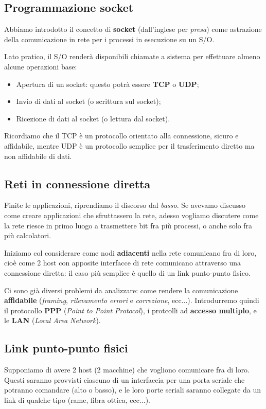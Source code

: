 \documentclass[a4paper,11pt]{article}
\begin{document}
\subsection{Programmazione socket}
Abbiamo introdotto il concetto di \textbf{socket} (dall'inglese per \textit{presa}) come astrazione della comunicazione in rete per i processi in esecuzione su un S/O.

Lato pratico, il S/O renderà disponibili chiamate a sistema per effettuare almeno alcune operazioni base:
\begin{itemize}
	\item Apertura di un socket: questo potrà essere \textbf{TCP} o \textbf{UDP};
	\item Invio di dati al socket (o scrittura sul socket);
	\item Ricezione di dati al socket (o lettura dal socket).
\end{itemize}

Ricordiamo che il TCP è un protocollo orientato alla connessione, sicuro e affidabile, mentre UDP è un protocollo semplice per il trasferimento diretto ma non affidabile di dati.

\subsection{Reti in connessione diretta}
Finite le applicazioni, riprendiamo il discorso dal \textit{basso}. Se avevamo discusso come creare applicazioni che sfruttassero la rete, adesso vogliamo discutere come la rete riesce in primo luogo a trasmettere bit fra più processi, o anche solo fra più calcolatori.

Iniziamo col considerare come nodi \textbf{adiacenti} nella rete comunicano fra di loro, cioè come 2 host con apposite interfacce di rete comunicano attraverso una connessione diretta: il caso più semplice è quello di un link punto-punto fisico.

Ci sono già diversi problemi da analizzare: come rendere la comunicazione \textbf{affidabile} (\textit{framing}, \textit{rilevamento errori} e \textit{correzione}, ecc...).
Introdurremo quindi il protocollo \textbf{PPP} (\textit{Point to Point Protocol}), i protcolli ad \textbf{accesso multiplo}, e le \textbf{LAN} (\textit{Local Area Network}).

\subsection{Link punto-punto fisici}
Supponiamo di avere 2 host (2 macchine) che vogliono comunicare fra di loro. Questi saranno provvisti ciascuno di un interfaccia per una porta seriale che potranno comandare (alto o basso), e le loro porte seriali saranno collegate da un link di qualche tipo (rame, fibra ottica, ecc...).
\end{document}
